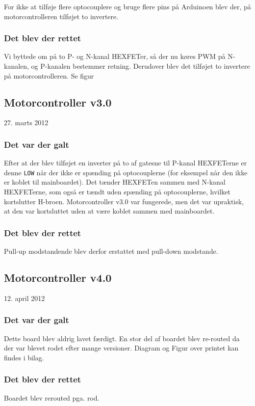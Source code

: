 \documentclass[a4paper,oneside,article,danish,table]{memoir}
\newcommand{\boarddate}[1]{\textcolor{blue!80!black}{#1}}
\begin{document}
For ikke at tilføje flere optocouplere og bruge flere pins på Arduinoen blev der, på motorcontrolleren tilføjet to invertere.
\subsubsection{Det blev der rettet}
Vi byttede om på to P- og N-kanal HEXFETer, så der nu køres PWM på N-kanalen, og P-kanalen bestemmer retning. Derudover blev det tilføjet to invertere på motorcontrolleren. Se figur 

\subsection{Motorcontroller v3.0}
\boarddate{27. marts 2012}
\subsubsection{Det var der galt} 
Efter at der blev tilføjet en inverter på to af gatesne til P-kanal HEXFETerne er denne \texttt{LOW} når der ikke er spænding på optocouplerne (for eksempel når den ikke er koblet til mainboardet). Det tænder HEXFETen sammen med N-kanal HEXFETerne, som også er tændt uden spænding på optocouplerne, hvilket kortslutter H-broen. Motorcontroller v3.0 var fungerede, men det var upraktisk, at den var kortsluttet uden at være koblet sammen med mainboardet.

\subsubsection{Det blev der rettet}
Pull-up modstandende blev derfor erstattet med pull-down modstande.
\subsection{Motorcontroller v4.0}
\boarddate{12. april 2012} 
\subsubsection{Det var der galt} 
Dette board blev aldrig lavet færdigt. 
En stor del af boardet blev re-routed da der var blevet rodet efter mange versioner. Diagram og Figur over printet kan findes i bilag. 
\subsubsection{Det blev der rettet}
Boardet blev rerouted pga. rod.
\end{document}
